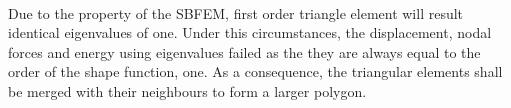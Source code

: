 
\paragraph{}
Due to the property of the SBFEM, first order triangle element will result identical eigenvalues of one.
Under this circumstances, the displacement, nodal forces and energy using eigenvalues failed as the they are always equal to the order of the shape function, one.
As a consequence, the triangular elements shall be merged with their neighbours to form a larger polygon.